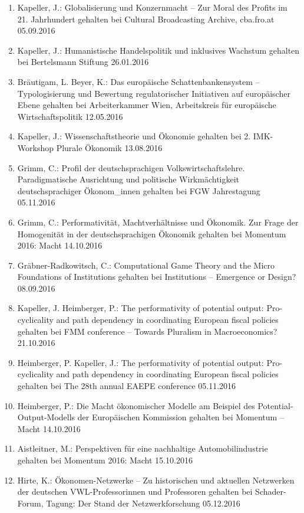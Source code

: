 \begin{enumerate}
	\item Kapeller, J.: Globalisierung und Konzernmacht – Zur Moral des Profits im 21. Jahrhundert gehalten bei Cultural Broadcasting Archive, cba.fro.at 05.09.2016
	\item Kapeller, J.: Humanistische Handelspolitik und inklusives Wachstum gehalten bei Bertelsmann Stiftung 26.01.2016
	\item Bräutigam, L. Beyer, K.: Das europäische Schattenbankensystem – Typologisierung und Bewertung regulatorischer Initiativen auf europäischer Ebene gehalten bei Arbeiterkammer Wien, Arbeitskreis für europäische Wirtschaftspolitik 12.05.2016
	\item Kapeller, J.: Wissenschaftstheorie und Ökonomie gehalten bei 2. IMK-Workshop \glqq Plurale Ökonomik\grqq{} 13.08.2016
	\item Grimm, C.: Profil der deutschsprachigen Volkswirtschaftslehre. Paradigmatische Ausrichtung und politische Wirkmächtigkeit deutschsprachiger Ökonom\_innen gehalten bei FGW Jahrestagung 05.11.2016
	\item Grimm, C.: Performativität, Machtverhältnisse und Ökonomik. Zur Frage der Homogenität in der deutschsprachigen Ökonomik gehalten bei Momentum 2016: Macht 14.10.2016
	\item Gräbner-Radkowitsch, C.: Computational Game Theory and the Micro Foundations of Institutions gehalten bei Institutions -- Emergence or Design? 08.09.2016
	\item Kapeller, J. Heimberger, P.: The performativity of potential output: Pro-cyclicality and path dependency in coordinating European fiscal policies gehalten bei FMM conference -- Towards Pluralism in Macroeconomics? 21.10.2016
	\item Heimberger, P. Kapeller, J.: The performativity of potential output: Pro-cyclicality and path dependency in coordinating European fiscal policies gehalten bei The 28th annual EAEPE conference 05.11.2016
	\item Heimberger, P.: Die Macht ökonomischer Modelle am Beispiel des \glqq Potential-Output\grqq{}-Modells der Europäischen Kommission gehalten bei Momentum -- Macht 14.10.2016
	\item Aistleitner, M.: Perspektiven für eine nachhaltige Automobilindustrie gehalten bei Momentum 2016: Macht 15.10.2016
	\item Hirte, K.: Ökonomen-Netzwerke – Zu historischen und aktuellen Netzwerken der deutschen VWL-Professorinnen und Professoren gehalten bei Schader-Forum, Tagung: Der Stand der Netzwerkforschung 05.12.2016

\end{enumerate}
